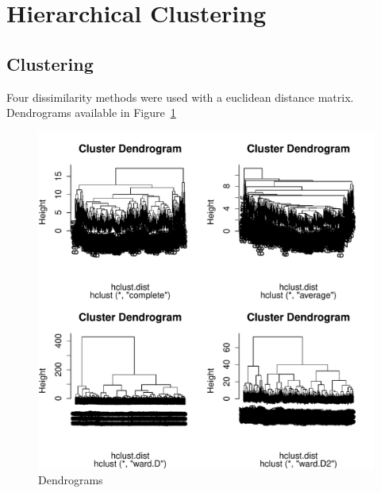 \documentclass[letterpaper,12pt]{article}
\begin{document}
\clearpage
\section{Hierarchical Clustering}

\subsection{Clustering}

Four dissimilarity methods were used with a euclidean distance matrix.
Dendrograms available in Figure~\ref{fig:hc-dendrograms}

\begin{figure}[h]
  \centering
  \includegraphics[width=\linewidth]{hc-dendrograms.pdf}
  \caption{Dendrograms}
  \label{fig:hc-dendrograms}
\end{figure}
\end{document}
